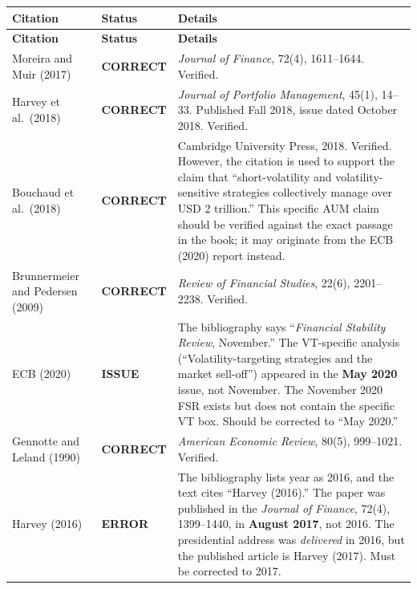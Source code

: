 \documentclass[12pt,a4paper]{article}
\begin{document}
\begin{longtable}{p{3.8cm}p{2.2cm}p{6.5cm}}
\toprule
\textbf{Citation} & \textbf{Status} & \textbf{Details} \\
\midrule
\endfirsthead
\toprule
\textbf{Citation} & \textbf{Status} & \textbf{Details} \\
\midrule
\endhead

Moreira and Muir (2017) &
\textcolor{lowgreen}{\textbf{CORRECT}} &
\emph{Journal of Finance}, 72(4), 1611--1644. Verified. \\[0.5em]

Harvey et al.\ (2018) &
\textcolor{lowgreen}{\textbf{CORRECT}} &
\emph{Journal of Portfolio Management}, 45(1), 14--33. Published Fall 2018, issue dated October 2018. Verified. \\[0.5em]

Bouchaud et al.\ (2018) &
\textcolor{lowgreen}{\textbf{CORRECT}} &
Cambridge University Press, 2018. Verified. However, the citation is used to support the claim that ``short-volatility and volatility-sensitive strategies collectively manage over USD 2 trillion.'' This specific AUM claim should be verified against the exact passage in the book; it may originate from the ECB (2020) report instead. \\[0.5em]

Brunnermeier and Pedersen (2009) &
\textcolor{lowgreen}{\textbf{CORRECT}} &
\emph{Review of Financial Studies}, 22(6), 2201--2238. Verified. \\[0.5em]

ECB (2020) &
\textcolor{medorange}{\textbf{ISSUE}} &
The bibliography says ``\emph{Financial Stability Review}, November.'' The VT-specific analysis (``Volatility-targeting strategies and the market sell-off'') appeared in the \textbf{May 2020} issue, not November. The November 2020 FSR exists but does not contain the specific VT box. Should be corrected to ``May 2020.'' \\[0.5em]

Gennotte and Leland (1990) &
\textcolor{lowgreen}{\textbf{CORRECT}} &
\emph{American Economic Review}, 80(5), 999--1021. Verified. \\[0.5em]

Harvey (2016) &
\textcolor{highred}{\textbf{ERROR}} &
The bibliography lists year as 2016, and the text cites ``Harvey (2016).'' The paper was published in the \emph{Journal of Finance}, 72(4), 1399--1440, in \textbf{August 2017}, not 2016. The presidential address was \emph{delivered} in 2016, but the published article is Harvey (2017). Must be corrected to 2017. \\[0.5em]


\end{longtable}
\end{document}
